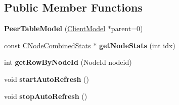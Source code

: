 \subsection*{Public Member Functions}
\begin{DoxyCompactItemize}
\item 
\mbox{\label{class_peer_table_model_a94e40794eeb946475a4a747c1fe1a2c2}} 
{\bfseries Peer\+Table\+Model} (\mbox{\hyperlink{class_client_model}{Client\+Model}} $\ast$parent=0)
\item 
\mbox{\label{class_peer_table_model_a98084d3299642316c71c5de3d36b9859}} 
const \mbox{\hyperlink{struct_c_node_combined_stats}{C\+Node\+Combined\+Stats}} $\ast$ {\bfseries get\+Node\+Stats} (int idx)
\item 
\mbox{\label{class_peer_table_model_aa735d366015dafba4c5d79dfb76abe49}} 
int {\bfseries get\+Row\+By\+Node\+Id} (Node\+Id nodeid)
\item 
\mbox{\label{class_peer_table_model_aba0f9c1535e2d718950edea1c166cc9d}} 
void {\bfseries start\+Auto\+Refresh} ()
\item 
\mbox{\label{class_peer_table_model_a2a738ac95fc16e0e1db9693eadc4f8b4}} 
void {\bfseries stop\+Auto\+Refresh} ()
\end{DoxyCompactItemize}
